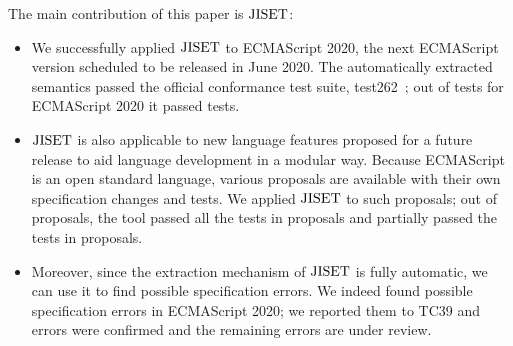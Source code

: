 The main contribution of this paper is \( \text{JISET} \):
\begin{itemize}[leftmargin=0.5cm]
\item We successfully applied \( \text{JISET} \) to ECMAScript 2020, the next
ECMAScript version scheduled to be released in June 2020.  The
automatically extracted semantics passed the official conformance test
suite, test262~\cite{test262}; out of  tests for
ECMAScript 2020 it passed  tests.
\item \( \text{JISET} \) is also applicable to new language features proposed
for a future release to aid language development in a modular way.
Because ECMAScript is an open standard language, various proposals are
available with their own specification changes and tests.  We applied
\( \text{JISET} \) to such proposals; out of  proposals, the tool
passed all the tests in  proposals and partially passed the
tests in  proposals.
\item Moreover, since the extraction mechanism of \( \text{JISET} \) is fully
automatic, we can use it to find possible specification errors.  We
indeed found  possible specification errors in ECMAScript
2020; we reported them to TC39 and  errors were confirmed and
the remaining  errors are under review.
\end{itemize}
